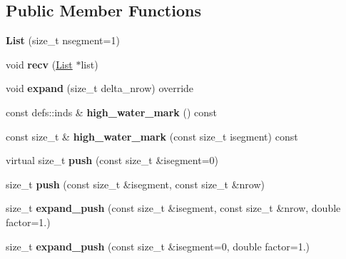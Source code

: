 \subsection*{Public Member Functions}
\begin{DoxyCompactItemize}
\item 
{\bfseries List} (size\+\_\+t nsegment=1)\hypertarget{classList_ad9a7f3e86dcdbca777ca841110f9b182}{}\label{classList_ad9a7f3e86dcdbca777ca841110f9b182}

\item 
void {\bfseries recv} (\hyperlink{classList}{List} $\ast$list)\hypertarget{classList_af9a90033ed5f37c86b10817d5f806aa8}{}\label{classList_af9a90033ed5f37c86b10817d5f806aa8}

\item 
void {\bfseries expand} (size\+\_\+t delta\+\_\+nrow) override\hypertarget{classList_ab7219d2e334446d8d9cf04d435c4a536}{}\label{classList_ab7219d2e334446d8d9cf04d435c4a536}

\item 
const defs\+::inds \& {\bfseries high\+\_\+water\+\_\+mark} () const \hypertarget{classList_a71aac8cca374b0a9d02b0b6646a682e6}{}\label{classList_a71aac8cca374b0a9d02b0b6646a682e6}

\item 
const size\+\_\+t \& {\bfseries high\+\_\+water\+\_\+mark} (const size\+\_\+t isegment) const \hypertarget{classList_aeb70d73014daa57c9e1e4521fbe92cc9}{}\label{classList_aeb70d73014daa57c9e1e4521fbe92cc9}

\item 
virtual size\+\_\+t {\bfseries push} (const size\+\_\+t \&isegment=0)\hypertarget{classList_a7b210981cf2d5fc3fa98ffcd60a20e19}{}\label{classList_a7b210981cf2d5fc3fa98ffcd60a20e19}

\item 
size\+\_\+t {\bfseries push} (const size\+\_\+t \&isegment, const size\+\_\+t \&nrow)\hypertarget{classList_a99ed396caa739a7cc372442c88c7aa3b}{}\label{classList_a99ed396caa739a7cc372442c88c7aa3b}

\item 
size\+\_\+t {\bfseries expand\+\_\+push} (const size\+\_\+t \&isegment, const size\+\_\+t \&nrow, double factor=1.)\hypertarget{classList_af3e8a3d6bf6364cb9f7c57bd87e110d0}{}\label{classList_af3e8a3d6bf6364cb9f7c57bd87e110d0}

\item 
size\+\_\+t {\bfseries expand\+\_\+push} (const size\+\_\+t \&isegment=0, double factor=1.)\hypertarget{classList_a00b36d166fef357fbfdf97db1dcc27d6}{}\label{classList_a00b36d166fef357fbfdf97db1dcc27d6}


\end{DoxyCompactItemize}
